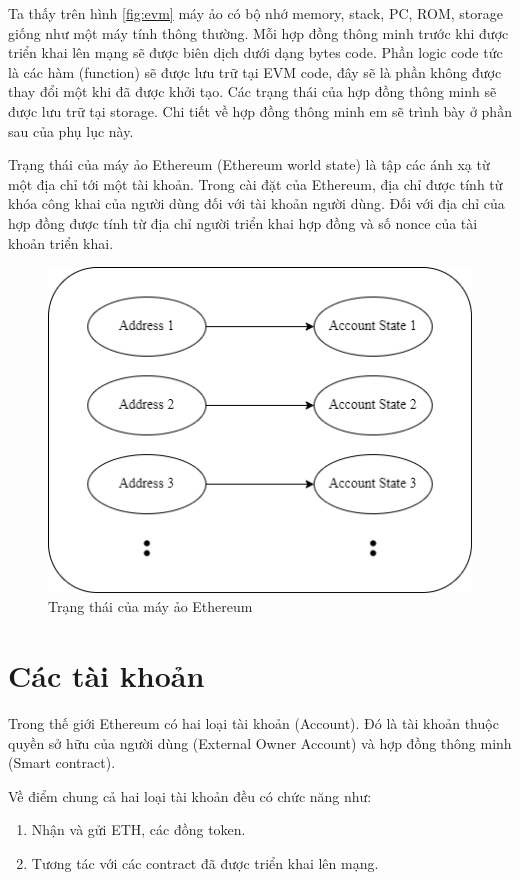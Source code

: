 \documentclass[../main.tex]{subfiles}
\begin{document}
Ta thấy trên hình \ref{fig:evm} máy ảo có bộ nhớ memory, stack, PC, ROM, storage giống như một máy tính thông thường. Mỗi hợp đồng thông minh trước khi được triển khai lên mạng sẽ được biên dịch dưới dạng bytes code. Phần logic code tức là các hàm (function) sẽ được lưu trữ tại EVM code, đây sẽ là phần không được thay đổi một khi đã được khởi tạo. Các trạng thái của hợp đồng thông minh sẽ được lưu trữ tại storage. Chi tiết về hợp đồng thông minh em sẽ trình bày ở phần sau của phụ lục này.

Trạng thái của máy ảo Ethereum (Ethereum world state) là tập các ánh xạ từ một địa chỉ tới một tài khoản. Trong cài đặt của Ethereum, địa chỉ được tính từ khóa công khai của người dùng đối với tài khoản người dùng. Đối với địa chỉ của hợp đồng được tính từ địa chỉ người triển khai hợp đồng và số nonce của tài khoản triển khai.

\begin{figure}[h!]
    \centering
\includegraphics[scale = 0.7]{Figure/worldState.png}
    \caption{Trạng thái của máy ảo Ethereum}
    \label{fig:worldState}
\end{figure}


\section{Các tài khoản}

Trong thế giới Ethereum có hai loại tài khoản (Account). Đó là tài khoản thuộc quyền sở hữu của người dùng (External Owner Account) và hợp đồng thông minh (Smart contract). 

Về điểm chung cả hai loại tài khoản đều có chức năng như:
\begin{enumerate}
    \item Nhận và gửi ETH, các đồng token.
    \item Tương tác với các contract đã được triển khai lên mạng.
\end{enumerate}
\end{document}
